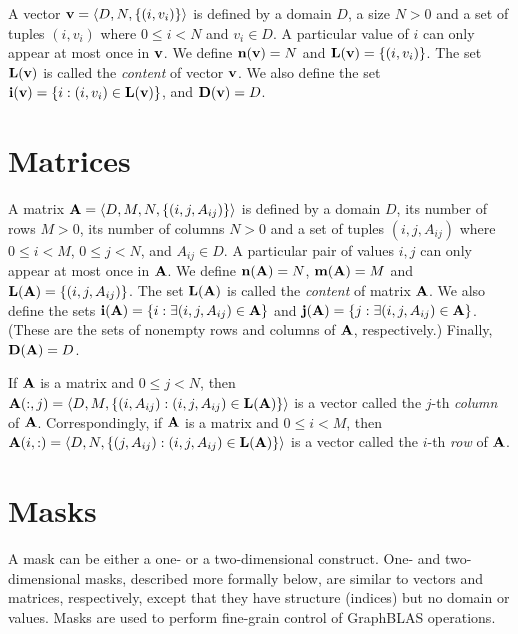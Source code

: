 A vector ${\bf v} = \langle D, N, \{ (i,v_i) \} \rangle$ is defined
by a domain $D$, a size $N>0$ and a set of tuples $(i,v_i)$ where
$0 \leq i < N$ and $v_i \in D$. A particular value of $i$ can only
appear at most once in ${\bf v}$. We define $\bold{n}({\bf v}) =
N$ and $\bold{L}({\bf v}) = \{ (i,v_i) \}$. The set $\bold{L}({\bf v})$ is called
the \emph{content} of vector ${\bf v}$. We also define the set
${\bf i({\bf v})} = \{ i : (i,v_i) \in \bold{L}({\bf v}) \}$,
and $\bold{D}({\bf v}) = D$.

\section{Matrices}
\label{Sec:Matrices}

A matrix ${\bf A} = \langle D, M, N, \{ (i,j,A_{ij}) \} \rangle$ is
defined by a domain $D$, its number of rows $M>0$, its number of columns
$N>0$ and a set of tuples $(i,j,A_{ij})$ where $0 \leq i < M$, $0 \leq
j < N$, and $A_{ij} \in D$. A particular pair of values $i,j$ can only
appear at most once in ${\bf A}$. We define $\bold{n}({\bf A})
= N$,  $\bold{m}({\bf A}) = M$ and $\bold{L}({\bf A}) = \{
(i,j,A_{ij}) \}$.  
The set $\bold{L}({\bf A})$ is called the \emph{content} of matrix ${\bf A}$.
We also define the sets ${\bf i({\bf A})} = \{
i : \exists (i,j,A_{ij}) \in {\bf A} \}$ and ${\bf j({\bf A})}
= \{ j : \exists (i,j,A_{ij}) \in {\bf A} \}$.  (These are the sets
of nonempty rows and columns of ${\bf A}$, respectively.)  Finally,
$\bold{D}({\bf A}) = D$.

If ${\bf A}$ is a matrix and $0 \leq j < N$, then ${\bf A}(:,j)
= \langle D, M, \{(i,A_{ij}) : (i,j,A_{ij}) \in \bold{L}({\bf A})
\} \rangle$ is a vector called the $j$-th \emph{column}
of ${\bf A}$. Correspondingly, if ${\bf A}$ is a matrix and
$0 \leq i < M$, then ${\bf A}(i,:) = \langle D, N, \{(j,A_{ij}) :
(i,j,A_{ij}) \in \bold{L}({\bf A}) \} \rangle$ is a vector called
the $i$-th \emph{row} of ${\bf A}$.

\section{Masks}
\label{Sec:Masks}

A mask can be either a one- or a two-dimensional construct.
One- and two-dimensional masks, described more formally below, are
similar to vectors and matrices, respectively, except that they have
structure (indices) but no domain or values.
Masks are used to perform fine-grain control of GraphBLAS operations.

